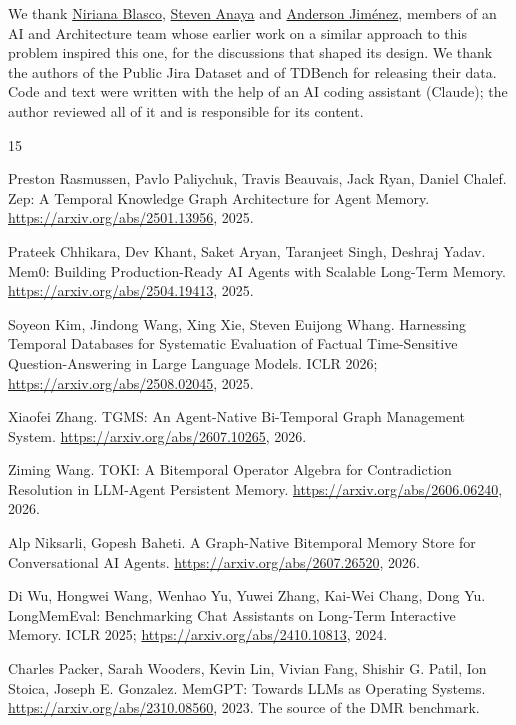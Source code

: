 \documentclass{article}
\begin{document}
We thank \href{https://www.linkedin.com/in/niriana-blasco/}{Niriana Blasco}, \href{https://www.linkedin.com/in/steven-anaya-colo/}{Steven Anaya} and \href{https://www.linkedin.com/in/anderson-jim\%C3\%A9nez-torres/}{Anderson Jiménez}, members of an AI and Architecture team whose earlier work on a similar approach to this problem inspired this one, for the discussions that shaped its design. We thank the authors of the Public Jira Dataset and of TDBench for releasing their data. Code and text were written with the help of an AI coding assistant (Claude); the author reviewed all of it and is responsible for its content.

\begin{thebibliography}{15}

Preston Rasmussen, Pavlo Paliychuk, Travis Beauvais, Jack Ryan, Daniel Chalef. Zep: A Temporal Knowledge Graph Architecture for Agent Memory. \url{https://arxiv.org/abs/2501.13956}, 2025.

Prateek Chhikara, Dev Khant, Saket Aryan, Taranjeet Singh, Deshraj Yadav. Mem0: Building Production-Ready AI Agents with Scalable Long-Term Memory. \url{https://arxiv.org/abs/2504.19413}, 2025.

Soyeon Kim, Jindong Wang, Xing Xie, Steven Euijong Whang. Harnessing Temporal Databases for Systematic Evaluation of Factual Time-Sensitive Question-Answering in Large Language Models. ICLR 2026; \url{https://arxiv.org/abs/2508.02045}, 2025.

Xiaofei Zhang. TGMS: An Agent-Native Bi-Temporal Graph Management System. \url{https://arxiv.org/abs/2607.10265}, 2026.

Ziming Wang. TOKI: A Bitemporal Operator Algebra for Contradiction Resolution in LLM-Agent Persistent Memory. \url{https://arxiv.org/abs/2606.06240}, 2026.

Alp Niksarli, Gopesh Baheti. A Graph-Native Bitemporal Memory Store for Conversational AI Agents. \url{https://arxiv.org/abs/2607.26520}, 2026.

Di Wu, Hongwei Wang, Wenhao Yu, Yuwei Zhang, Kai-Wei Chang, Dong Yu. LongMemEval: Benchmarking Chat Assistants on Long-Term Interactive Memory. ICLR 2025; \url{https://arxiv.org/abs/2410.10813}, 2024.

Charles Packer, Sarah Wooders, Kevin Lin, Vivian Fang, Shishir G. Patil, Ion Stoica, Joseph E. Gonzalez. MemGPT: Towards LLMs as Operating Systems. \url{https://arxiv.org/abs/2310.08560}, 2023. The source of the DMR benchmark.


\end{thebibliography}
\end{document}
